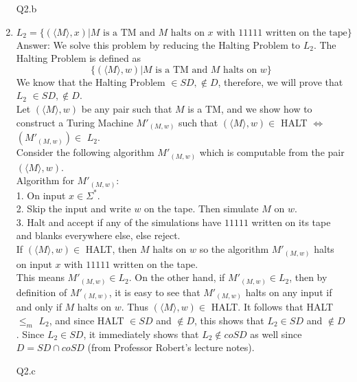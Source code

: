 \documentclass{csc_assignment}
\begin{document}
\begin{description}
\begin{enumerate}
  

\item[Q2.b]

  \item $L_2 = \{(\langle{M}\rangle, x) | M \text{ is a TM and } M \text{ halts on } x \text{ with } 11111 \text{ written on the tape\}}$ \\
  Answer: We solve this problem by reducing the Halting Problem to $L_{2}$. The Halting Problem is defined as $$\{(\langle M \rangle, w) | M \text{ is a TM and } M \text{ halts on } w\}$$ We know that the Halting Problem $\in SD, \notin D$, therefore, we will prove that $L_{2}$ $\in SD, \notin D$.\\ Let $(\langle M \rangle, w)$ be any pair such that $M$ is a TM, and we show how to construct a Turing Machine $M'_{(M,w)}$ such that $(\langle M \rangle, w) \in$ HALT $\Leftrightarrow$ $(M'_{(M,w)}) \in$ $L_{2}$. \\ Consider the following algorithm $M'_{(M,w)}$ which is computable from the pair $(\langle M \rangle, w)$.\\ Algorithm for $M'_{(M,w)}$: \\ 1. On input $x \in \Sigma^{*}$. \\ 2. Skip the input and write $w$ on the tape. Then simulate $M$ on $w$. \\ 3. Halt and accept if any of the simulations have $11111$ written on its tape and blanks everywhere else, else reject. \\ If $(\langle M \rangle, w) \in$ HALT, then $M$ halts on $w$ so the algorithm $M'_{(M,w)}$ halts on input $x$ with $11111$ written on the tape.\\ This means $M'_{(M,w)} \in L_{2}$. On the other hand, if $M'_{(M,w)} \in L_{2}$, then by definition of $M'_{(M,w)}$, it is easy to see that $M'_{(M,w)}$ halts on any input if and only if $M$ halts on $w$. Thus $(\langle M \rangle, w) \in$ HALT. It follows that HALT $\leq_{m}$ $L_{2}$, and since HALT $\in SD$ and $\notin D$, this shows that $L_{2} \in SD$ and $\notin D$. Since $L_{2} \in SD$, it immediately shows that $L_{2} \notin coSD$ as well since $D = SD \cap coSD$ (from Professor Robert's lecture notes).
  
\item[Q2.c]


\end{enumerate}
\end{description}
\end{document}
